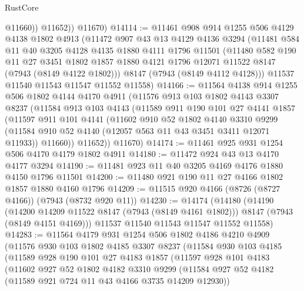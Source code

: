 \begin{lexlean}{RustCore}
\begin{coremodule}
              @11660))
          @11652))
      @11670)
@14114 := @11461
    @908
    @914
    @1255
    @506
    @4129
    @4138
    @1802
    @4913
    (@11472
      @907
      @43
      @13
      @4129
      @4136
      @3294
      (@11481
        @584
        @11
        @40
        @3205
        @4128
        @4135
        @1880
        @4111
        @1796
        @11501
        (@11480
          @582
          @190
          @11
          @27
          @3451
          @1802
          @1857
          @1880
          @4121
          @1796
          @12071
          @11522
          @8147
          (@7943 (@8149 @4122 @1802)))
        @8147
        (@7943 (@8149 @4112 @4128)))
      @11537
      @11540
      @11543
      @11547
      @11552
      @11558)
@14166 := @11564
    @4138
    @914
    @1255
    @506
    @1802
    @4144
    @4170
    @4911
    (@11576
      @913
      @103
      @1802
      @4143
      @3307
      @8237
      (@11584
        @913
        @103
        @4143
        (@11589
          @911
          @190
          @101
          @27
          @4141
          @1857
          (@11597
            @911
            @101
            @4141
            (@11602
              @910
              @52
              @1802
              @4140
              @3310
              @9299
              (@11584 @910 @52 @4140 (@12057 @563 @11 @43 @3451 @3411 @12071 @11933))
              @11660))
          @11652))
      @11670)
@14174 := @11461 @925 @931 @1254 @506 @4170 @4179 @1802 @4911
@14180 := @11472 @924 @43 @13 @4170 @4177 @3294
@14190 := @11481 @923 @11 @40 @3205 @4169 @4176 @1880 @4150 @1796 @11501
@14200 := @11480 @921 @190 @11 @27 @4166 @1802 @1857 @1880 @4160 @1796
@14209 := @11515 @920 @4166 (@8726 (@8727 @4166)) (@7943 (@8732 @920 @11))
@14230 := @14174
    (@14180
      (@14190
        (@14200 @14209 @11522 @8147 (@7943 (@8149 @4161 @1802)))
        @8147
        (@7943 (@8149 @4151 @4169)))
      @11537
      @11540
      @11543
      @11547
      @11552
      @11558)
@14283 := @11564
    @4179
    @931
    @1254
    @506
    @1802
    @4186
    @4210
    @4909
    (@11576
      @930
      @103
      @1802
      @4185
      @3307
      @8237
      (@11584
        @930
        @103
        @4185
        (@11589
          @928
          @190
          @101
          @27
          @4183
          @1857
          (@11597
            @928
            @101
            @4183
            (@11602
              @927
              @52
              @1802
              @4182
              @3310
              @9299
              (@11584 @927 @52 @4182 (@11589 @921 @724 @11 @43 @4166 @3735 @14209 @12930))

\end{coremodule}
\end{lexlean}
